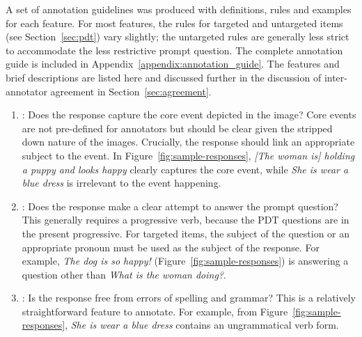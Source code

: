 A set of annotation guidelines was produced with definitions, rules and examples for each feature. For most features, the rules for targeted and untargeted items (see Section~\ref{sec:pdt}) vary slightly; the untargeted rules are generally less strict to accommodate the less restrictive prompt question. The complete annotation guide is included in Appendix~\ref{appendix:annotation_guide}. The features and brief descriptions are listed here and discussed further in the discussion of inter-annotator agreement in Section~\ref{sec:agreement}.

\begin{enumerate}
\item \textbf{}: Does the response capture the core event depicted in the image? Core events are not pre-defined for annotators but should be clear given the stripped down nature of the images. Crucially, the response should link an appropriate subject to the event.  In Figure~\ref{fig:sample-responses}, \textit{[The woman is] holding a puppy and looks happy} clearly captures the core event, while \textit{She is wear a blue dress} is irrelevant to the event happening.
\item \textbf{}: Does the response make a clear attempt to answer the prompt question? This generally requires a progressive verb, because the PDT questions are in the present progressive. For targeted items, the subject of the question or an appropriate pronoun must be used as the subject of the response.  For example, \textit{The dog is so happy!} (Figure~\ref{fig:sample-responses}) is answering a question other than \textit{What is the woman doing?}. 
\item \textbf{}: Is the response free from errors of spelling and grammar?  
This is a relatively straightforward feature to annotate. For example, from Figure~\ref{fig:sample-responses}, \textit{She is wear a blue dress} contains an ungrammatical verb form.


\end{enumerate}
